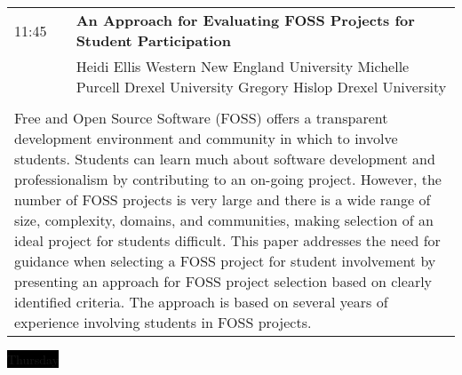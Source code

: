 \documentclass[]{article}
\begin{document}
\begin{longtable}{p{1in}p{3in}p{1in}}
11:45 & \multicolumn{2}{p{3.75in}}{\raggedright\large\textbf{An Approach for Evaluating FOSS Projects for Student Participation}} \\
& \multicolumn{2}{p{3.75in}}{Heidi Ellis Western New England University
Michelle Purcell Drexel University
Gregory Hislop Drexel University} \\ \\
\multicolumn{3}{p{5in}}{Free and Open Source Software (FOSS) offers a transparent development environment and community in which to involve students. Students can learn much about software development and professionalism by contributing to an on-going project. However, the number of FOSS projects is very large and there is a wide range of size, complexity, domains, and communities, making selection of an ideal project for students difficult. This paper addresses the need for guidance when selecting a FOSS project for student involvement by presenting an approach for FOSS project selection based on clearly identified criteria. The approach is based on several years of experience involving students in FOSS projects.}
 
\end{longtable}

\colorbox{black}{\color{white} Thursday}
\end{document}
